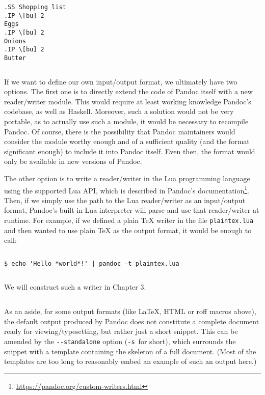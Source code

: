 \documentclass[
  digital,     %
  oneside,     %
  nosansbold,  %
  nocolorbold, %
  lof,         %
  lot,         %
]{fithesis4}
\begin{document}
$ $

\noindent
\begin{lstlisting}
.SS Shopping list
.IP \[bu] 2
Eggs
.IP \[bu] 2
Onions
.IP \[bu] 2
Butter
\end{lstlisting}

$ $

If we want to define our own input/output format, we ultimately have two options. The first one is to directly extend the code of Pandoc itself with a new reader/writer module. This would require at least working knowledge Pandoc's codebase, as well as Haskell. Moreover, such a solution would not be very portable, as to actually use such a module, it would be necessary to recompile Pandoc. Of course, there is the possibility that Pandoc maintainers would consider the module worthy enough and of a sufficient quality (and the format significant enough) to include it into Pandoc itself. Even then, the format would only be available in new versions of Pandoc.

The other option is to write a reader/writer in the Lua programming language using the supported Lua API, which is described in Pandoc's documentation\footnote{\url{https://pandoc.org/custom-writers.html}}. Then, if we simply use the path to the Lua reader/writer as an input/output format, Pandoc's built-in Lua interpreter will parse and use that reader/writer at runtime. For example, if we defined a plain \TeX{} writer in the file \texttt{plaintex.lua} and then wanted to use plain \TeX{} as the output format, it would be enough to call:

$ $

\noindent
\begin{lstlisting}
$ echo 'Hello *world*!' | pandoc -t plaintex.lua
\end{lstlisting}

$ $

\noindent
We will construct such a writer in Chapter 3.

$ $

As an aside, for some output formats (like \LaTeX{}, HTML or roff macros above), the default output produced by Pandoc does not constitute a complete document ready for viewing/typesetting, but rather just a short snippet. This can be amended by the \texttt{-{}-standalone} option (\texttt{-s}~for short), which surrounds the snippet with a template containing the skeleton of a full document. (Most of the templates are too long to reasonably embed an example of such an output here.)
\end{document}
